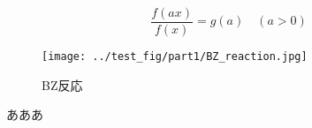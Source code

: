 \documentclass[autodetect-engine,dvipdfmx-if-dvi,a4paper,ja=standard]{bxjsbook}
\begin{document}
\begin{equation}
  \frac{f(ax)}{f(x)}=g(a) \quad (a>0)
\end{equation}
\begin{figure}[htbp]
  \centering
  \texttt{[image: ../test\_fig/part1/BZ\_reaction.jpg]}
  \caption{BZ反応}
\end{figure}
あああ\cite{BZ_reaction}\cite{eckert1998square}\cite{kondo1995reaction}\cite{koschmieder1993benard}\cite{mukouyama2002sensory}\cite{oniciu1991some}\cite{schilardi1998evolution}\cite{witten1981diffusion}\cite{めっき添加剤の作用機構と表面形状制御}\cite{表面粗さ曲線のフラクタル解析}\cite{matsushita1984fractal}\cite{test_ref}


\end{document}
